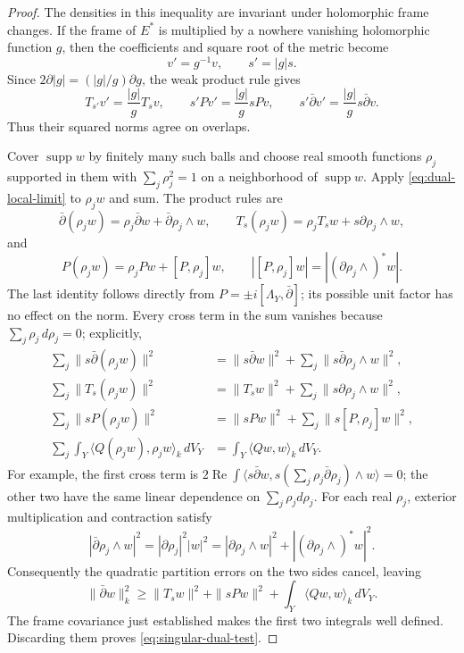 \documentclass[11pt,reqno]{amsart}
\numberwithin{equation}{section}
\theoremstyle{definition}
\theoremstyle{remark}
\begin{document}
\begin{proof}
The densities in this inequality are invariant under holomorphic
frame changes.  If the frame of $E^*$ is multiplied by a nowhere
vanishing holomorphic function $g$, then the coefficients and square
root of the metric become
\[
 v'=g^{-1}v,\qquad s'=|g|s.
\]
Since $2\partial|g|=(|g|/g)\partial g$, the weak product rule gives
\[
 T_{s'}v'=\frac{|g|}{g}T_sv,\qquad
 s'Pv'=\frac{|g|}{g}sPv,\qquad
 s'\bar\partial v'=\frac{|g|}{g}s\bar\partial v.
\]
Thus their squared norms agree on overlaps.

Cover $\operatorname{supp}w$ by finitely many such balls and choose
real smooth functions $\rho_j$ supported in them with
$\sum_j\rho_j^2=1$ on a neighborhood of $\operatorname{supp}w$.
Apply \eqref{eq:dual-local-limit} to $\rho_jw$ and sum.  The product
rules are
\[
 \bar\partial(\rho_jw)=\rho_j\bar\partial w
                             +\bar\partial\rho_j\wedge w,\qquad
 T_s(\rho_jw)=\rho_jT_sw+s\partial\rho_j\wedge w,
\]
and
\[
 P(\rho_jw)=\rho_jPw+[P,\rho_j]w,\qquad
 |[P,\rho_j]w|=|(\partial\rho_j\wedge)^*w|.
\]
The last identity follows directly from
$P=\pm i[\Lambda_Y,\bar\partial]$; its possible unit factor has no
effect on the norm.  Every cross term in the sum vanishes because
$\sum_j\rho_j\,d\rho_j=0$; explicitly,
\begin{align*}
 \sum_j\|s\bar\partial(\rho_jw)\|^2
 &=\|s\bar\partial w\|^2
        +\sum_j\|s\bar\partial\rho_j\wedge w\|^2,\\
 \sum_j\|T_s(\rho_jw)\|^2
 &=\|T_sw\|^2+\sum_j\|s\partial\rho_j\wedge w\|^2,\\
 \sum_j\|sP(\rho_jw)\|^2
 &=\|sPw\|^2+\sum_j\|s[P,\rho_j]w\|^2,\\
 \sum_j\int_Y\langle Q(\rho_jw),\rho_jw\rangle_k\,dV_Y
 &=\int_Y\langle Qw,w\rangle_k\,dV_Y.
\end{align*}
For example, the first cross term is
$2\operatorname{Re}\int\langle s\bar\partial w,
s(\sum_j\rho_j\bar\partial\rho_j)\wedge w\rangle=0$;
the other two have the same linear dependence on
$\sum_j\rho_jd\rho_j$.
For each real $\rho_j$, exterior
multiplication and contraction satisfy
\[
 |\bar\partial\rho_j\wedge w|^2
 =|\partial\rho_j|^2|w|^2
 =|\partial\rho_j\wedge w|^2
      +|(\partial\rho_j\wedge)^*w|^2.
\]
Consequently the quadratic partition errors on the two sides cancel,
leaving
\[
 \|\bar\partial w\|_k^2
 \ge\|T_sw\|^2+\|sPw\|^2
             +\int_Y\langle Qw,w\rangle_k\,dV_Y.
\]
The frame covariance just established makes the first two integrals
well defined.  Discarding them proves
\eqref{eq:singular-dual-test}.


\end{proof}
\end{document}
